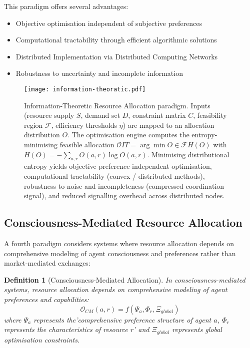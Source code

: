 \documentclass[12pt,a4paper]{article}
\newtheorem{definition}[theorem]{Definition}
\begin{document}
This paradigm offers several advantages:
\begin{itemize}
\item Objective optimisation independent of subjective preferences
\item Computational tractability through efficient algorithmic solutions
\item Distributed Implementation via Distributed Computing Networks
\item Robustness to uncertainty and incomplete information
\end{itemize}

\begin{figure}[t]
\centering
\texttt{[image: information-theoratic.pdf]}
\caption{Information-Theoretic Resource Allocation paradigm. Inputs (resource supply $S$, demand set $D$, constraint matrix $C$, feasibility region $\mathcal{F}$, efficiency thresholds $\eta$) are mapped to an allocation distribution $O$. The optimisation engine computes the entropy-minimising feasible allocation $\mathcal{O}{IT} = \arg\min{O \in \mathcal{F}} H(O)$ with $H(O) = -\sum_{a,r} O(a,r)\log O(a,r)$. Minimising distributional entropy yields objective preference-independent optimisation, computational tractability (convex / distributed methods), robustness to noise and incompleteness (compressed coordination signal), and reduced signalling overhead across distributed nodes.}
\label{fig:information-theoratic}
\end{figure}

\subsection{Consciousness-Mediated Resource Allocation}

A fourth paradigm considers systems where resource allocation depends on comprehensive modeling of agent consciousness and preferences rather than market-mediated exchanges:

\begin{definition}[Consciousness-Mediated Allocation]
In consciousness-mediated systems, resource allocation depends on comprehensive modeling of agent preferences and capabilities:
\begin{equation}
\mathcal{O}_{CM}(a,r) = f(\Psi_a, \Phi_r, \Xi_{global})
\end{equation}
where $\Psi_a$ represents the'comprehensive preference structure of agent $a$, $\Phi_r$ represents the characteristics of resource $r$' and $\Xi_{global}$ represents global optimisation constraints.
\end{definition}
\end{document}
